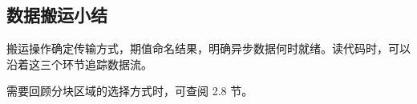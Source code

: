 \subsection*{数据搬运小结}

搬运操作确定传输方式，期值命名结果，\co@wait@ 明确异步数据何时就绪。读代码时，可以沿着这三个环节追踪数据流。

需要回顾分块区域的选择方式时，可查阅 2.8 节。
